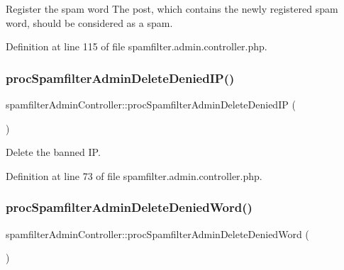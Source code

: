 Register the spam word The post, which contains the newly registered spam word, should be considered as a spam. 



Definition at line 115 of file spamfilter.\+admin.\+controller.\+php.

\mbox{\label{classspamfilterAdminController_a720e0592f60455d125b55ee797de2436}} 
\subsubsection{\texorpdfstring{proc\+Spamfilter\+Admin\+Delete\+Denied\+I\+P()}{procSpamfilterAdminDeleteDeniedIP()}}
{\footnotesize\ttfamily spamfilter\+Admin\+Controller\+::proc\+Spamfilter\+Admin\+Delete\+Denied\+IP (\begin{DoxyParamCaption}{ }\end{DoxyParamCaption})}



Delete the banned IP. 



Definition at line 73 of file spamfilter.\+admin.\+controller.\+php.

\mbox{\label{classspamfilterAdminController_aeb21ee58872bf61875be7e0fffabcf3a}} 
\subsubsection{\texorpdfstring{proc\+Spamfilter\+Admin\+Delete\+Denied\+Word()}{procSpamfilterAdminDeleteDeniedWord()}}
{\footnotesize\ttfamily spamfilter\+Admin\+Controller\+::proc\+Spamfilter\+Admin\+Delete\+Denied\+Word (\begin{DoxyParamCaption}{ }\end{DoxyParamCaption})}



